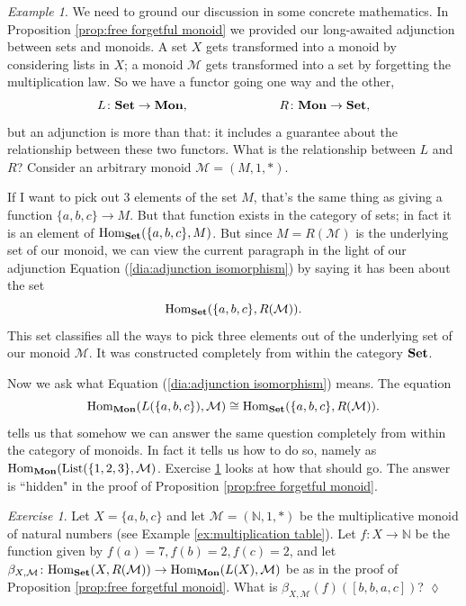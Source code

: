 \documentclass{book}
\def\tn{\textnormal}
\def\mc{\mathcal}
\def\NN{{\mathbb N}}
\def\Hom{\tn{Hom}}
\def\List{\tn{List}}
\def\to{\rightarrow}
\def\taking{\colon}
\def\iso{\cong}
\def\Mon{{\bf Mon}}
\def\Set{{\bf Set}}
\def\mcM{\mc{M}}
\theoremstyle{remark}
\newtheorem{example}[subsubsection]{Example}
\newtheorem{exc}[subsubsection]{Exercise}
\newenvironment{exercise}{\begin{exc}}{\hspace*{\fill}$\lozenge$\end{exc}}
\theoremstyle{definition}
\begin{document}
\begin{example}

We need to ground our discussion in some concrete mathematics. In Proposition \ref{prop:free forgetful monoid} we provided our long-awaited adjunction between sets and monoids. A set $X$ gets transformed into a monoid by considering lists in $X$; a monoid $\mcM$ gets transformed into a set by forgetting the multiplication law. So we have a functor going one way and the other, 
$$L\taking\Set\to\Mon,\hspace{1in}R\taking\Mon\to\Set,$$
but an adjunction is more than that: it includes a guarantee about the relationship between these two functors. What is the relationship between $L$ and $R$? Consider an arbitrary monoid $\mcM=(M,1,*)$.

If I want to pick out 3 elements of the set $M$, that's the same thing as giving a function $\{a,b,c\}\to M$. But that function exists in the category of sets; in fact it is an element of $\Hom_\Set(\{a,b,c\},M)$. But since $M=R(\mcM)$ is the underlying set of our monoid, we can view the current paragraph in the light of our adjunction Equation (\ref{dia:adjunction isomorphism}) by saying it has been about the set
$$\Hom_\Set(\{a,b,c\},R(\mcM)).$$
This set classifies all the ways to pick three elements out of the underlying set of our monoid $\mcM$. It was constructed completely from within the category $\Set$.

Now we ask what Equation (\ref{dia:adjunction isomorphism}) means. The equation
$$\Hom_\Mon(L(\{a,b,c\}),\mcM)\iso\Hom_\Set(\{a,b,c\},R(\mcM)).$$
tells us that somehow we can answer the same question completely from within the category of monoids. In fact it tells us how to do so, namely as $\Hom_\Mon(\List(\{1,2,3\},\mcM)$.  Exercise \ref{ex:monoid adjunction} looks at how that should go. The answer is ``hidden" in the proof of Proposition \ref{prop:free forgetful monoid}.

\end{example}

\begin{exercise}\label{ex:monoid adjunction}
Let $X=\{a,b,c\}$ and let $\mcM=(\NN,1,*)$ be the multiplicative monoid of natural numbers (see Example \ref{ex:multiplication table}). Let $f\taking X\to\NN$ be the function given by $f(a)=7, f(b)=2, f(c)=2$, and let $\beta_{X,\mcM}\taking\Hom_\Set(X,R(\mcM))\to\Hom_\Mon(L(X),\mcM)$ be as in the proof of Proposition \ref{prop:free forgetful monoid}. What is $\beta_{X,\mcM}(f)([b,b,a,c])$?
\end{exercise}
\end{document}
